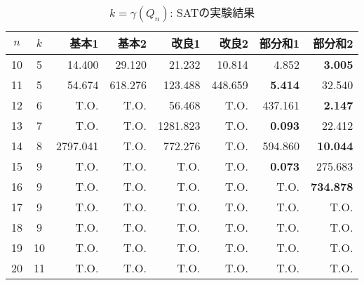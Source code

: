 \begin{table}[t]
 \caption{$k=\gamma(Q_n)$: SATの実験結果}
 \label{tb:exSAT}
 \centering
 \begin{tabular}{c|c|r|r|r|r|r|r} \hline
  $n$ & $k$ & 基本1 & 基本2 & 改良1 & 改良2 & 部分和1 & 部分和2 \\ \hline
  10 & 5 & 14.400 & 29.120 & 21.232 & 10.814 & 4.852 & \textbf{3.005} \\
  11 & 5 & 54.674 & 618.276 & 123.488 & 448.659 & \textbf{5.414} & 32.540 \\
  12 & 6 & T.O. & T.O. & 56.468 & T.O. & 437.161 & \textbf{2.147} \\
  13 & 7 & T.O. & T.O. & 1281.823 & T.O. & \textbf{0.093} & 22.412 \\
  14 & 8 & 2797.041 & T.O. & 772.276 & T.O. & 594.860 & \textbf{10.044}\\
  15 & 9 & T.O. & T.O. & T.O. & T.O. & \textbf{0.073} & 275.683 \\
  16 & 9 & T.O. & T.O. & T.O. & T.O. & T.O. & \textbf{734.878} \\
  17 & 9 & T.O. & T.O. & T.O. & T.O. & T.O. & T.O. \\
  18 & 9 & T.O. & T.O. & T.O. & T.O. & T.O. & T.O. \\
  19 & 10 & T.O. & T.O. & T.O. & T.O. & T.O. & T.O. \\
  20 & 11 & T.O. & T.O. & T.O. & T.O. & T.O. & T.O. \\ \hline
 \end{tabular}
\end{table}

